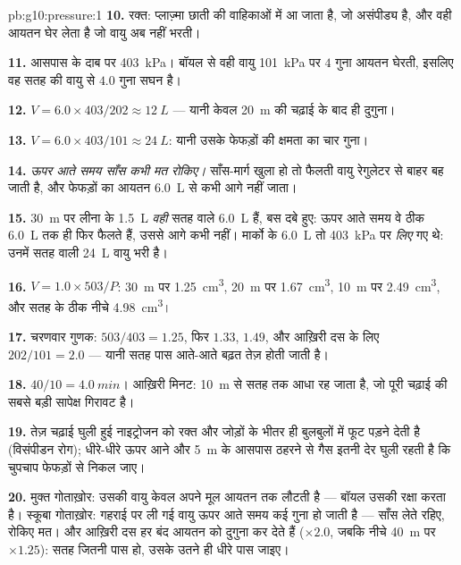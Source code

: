 \begin{solution}{pb:g10:pressure:1}
\textbf{10.} रक्त: प्लाज़्मा छाती की वाहिकाओं में आ जाता है, जो असंपीड्य
है, और वही आयतन घेर लेता है जो वायु अब नहीं भरती।

\textbf{11.} आसपास के दाब पर \qty{403}{kPa}। बॉयल से वही वायु \qty{101}{kPa}
पर $4$ गुना आयतन घेरती, इसलिए वह सतह की वायु से $4.0$ गुना सघन
है।

\textbf{12.} $V = 6.0 \times 403/202 \approx \qty{12}{L}$ --- यानी केवल \qty{20}{m} की चढ़ाई के बाद ही दुगुना।

\textbf{13.} $V = 6.0 \times 403/101 \approx \qty{24}{L}$: यानी उसके फेफड़ों की क्षमता का चार गुना।

\textbf{14.} \emph{ऊपर आते समय साँस कभी मत रोकिए।} साँस-मार्ग खुला हो तो
फैलती वायु रेगुलेटर से बाहर बह जाती है, और फेफड़ों का आयतन \qty{6.0}{L} से
कभी आगे नहीं जाता।

\textbf{15.} \qty{30}{m} पर लीना के \qty{1.5}{L} \emph{वही} सतह वाले \qty{6.0}{L} हैं,
बस दबे हुए: ऊपर आते समय वे ठीक \qty{6.0}{L} तक ही फिर फैलते हैं, उससे आगे
कभी नहीं। मार्को के \qty{6.0}{L} तो \qty{403}{kPa} पर \emph{लिए} गए थे: उनमें सतह
वाली \qty{24}{L} वायु भरी है।

\textbf{16.} $V = 1.0 \times 503/P$: \qty{30}{m} पर \qty{1.25}{cm^3}, \qty{20}{m} पर \qty{1.67}{cm^3}, \qty{10}{m} पर
\qty{2.49}{cm^3}, और सतह के ठीक नीचे \qty{4.98}{cm^3}।

\textbf{17.} चरणवार गुणक: $503/403 = 1.25$, फिर $1.33$, $1.49$, और आख़िरी दस
 के लिए $202/101 = 2.0$ --- यानी सतह पास आते-आते बढ़त तेज़ होती
जाती है।

\textbf{18.} $40/10 = \qty{4.0}{min}$। आख़िरी मिनट: \qty{10}{m} से सतह तक  आधा रह जाता है, जो पूरी चढ़ाई की सबसे बड़ी सापेक्ष गिरावट है।

\textbf{19.} तेज़ चढ़ाई घुली हुई नाइट्रोजन को रक्त और जोड़ों के भीतर ही
बुलबुलों में फूट पड़ने देती है (विसंपीडन रोग); धीरे-धीरे ऊपर आने और
\qty{5}{m} के आसपास ठहरने से गैस इतनी देर घुली रहती है कि चुपचाप फेफड़ों से
निकल जाए।

\textbf{20.} मुक्त गोताख़ोर: उसकी वायु केवल अपने मूल आयतन तक लौटती है ---
बॉयल उसकी रक्षा करता है। स्कूबा गोताख़ोर: गहराई पर ली गई वायु ऊपर आते
समय कई गुना हो जाती है --- साँस लेते रहिए, रोकिए मत। और आख़िरी दस
 हर बंद आयतन को दुगुना कर देते हैं ($\times 2.0$, जबकि नीचे
\qty{40}{m} पर $\times 1.25$): सतह जितनी पास हो, उसके उतने ही धीरे पास जाइए।
\end{solution}

